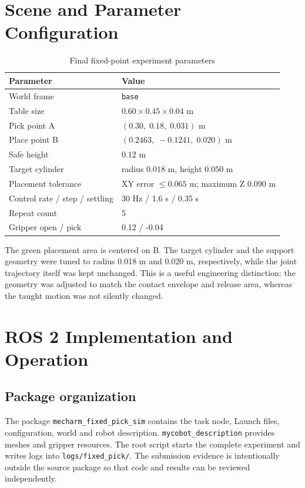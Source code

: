 \documentclass[11pt,a4paper]{article}
\newcommand{\code}[1]{\texttt{\footnotesize #1}}
\begin{document}
\section{Scene and Parameter Configuration}
\begin{table}[H]
\centering\small
\caption{Final fixed-point experiment parameters}
\begin{tabular}{ll}
\toprule
Parameter & Value\\
\midrule
World frame & \code{base}\\
Table size & $0.60\times0.45\times0.04$ m\\
Pick point A & $(0.30,\;0.18,\;0.031)$ m\\
Place point B & $(0.2463,\;-0.1241,\;0.020)$ m\\
Safe height & $0.12$ m\\
Target cylinder & radius $0.018$ m, height $0.050$ m\\
Placement tolerance & XY error $\leq0.065$ m; maximum Z $0.090$ m\\
Control rate / step / settling & 30 Hz / 1.6 s / 0.35 s\\
Repeat count & 5\\
Gripper open / pick & 0.12 / -0.04\\
\bottomrule
\end{tabular}
\end{table}

The green placement area is centered on B. The target cylinder and the support geometry were tuned to radius 0.018 m and 0.020 m, respectively, while the joint trajectory itself was kept unchanged. This is a useful engineering distinction: the geometry was adjusted to match the contact envelope and release area, whereas the taught motion was not silently changed.

\section{ROS 2 Implementation and Operation}
\subsection{Package organization}
The package \code{mecharm\_fixed\_pick\_sim} contains the task node, Launch files, configuration, world and robot description. \code{mycobot\_description} provides meshes and gripper resources. The root script starts the complete experiment and writes logs into \code{logs/fixed\_pick/}. The submission evidence is intentionally outside the source package so that code and results can be reviewed independently.
\end{document}

